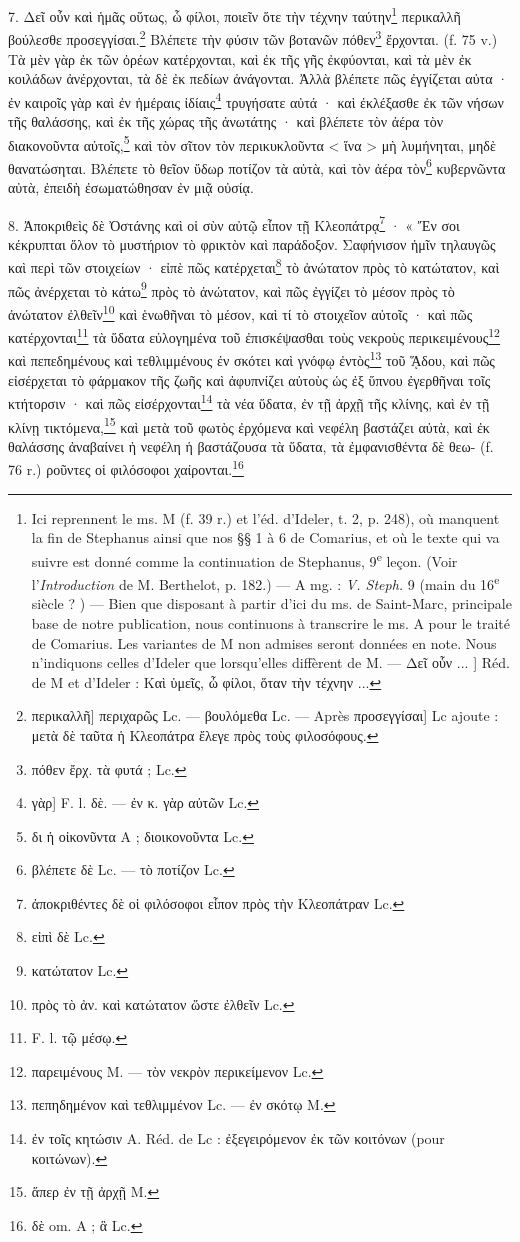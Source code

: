 \documentclass[a4paper, 11pt, oneside, polutonikogreek, french]{article}
\begin{document}
7. Δεῖ οὖν καὶ ἡμᾶς οὕτως, ὧ φίλοι, ποιεῖν ὅτε τὴν τέχνην ταύτην\footnote{Ici reprennent le ms. M (f. 39 r.) et l'éd. d'Ideler, t. 2, p. 248), où manquent la fin de Stephanus ainsi que nos §§ 1 à 6 de Comarius, et où le texte qui va suivre est donné comme la continuation de Stephanus, 9\textsuperscript{e} leçon. (Voir l'\emph{Introduction} de M. Berthelot, p. 182.) --- A mg. : \emph{V. Steph.} 9 (main du 16\textsuperscript{e} siècle ? ) --- Bien que disposant à partir d'ici du ms. de Saint-Marc, principale base de notre publication, nous continuons à transcrire le ms. A pour le traité de Comarius. Les variantes de M non admises seront données en note. Nous n'indiquons celles d'Ideler que lorsqu'elles diffèrent de M. --- Δεῖ οὗν ... ] Réd. de M et d'Ideler : Καὶ ὑμεῖς, ὦ φίλοι, ὅταν τὴν τέχνην ...} περικαλλῆ βούλεσθε προσεγγίσαι.\footnote{περικαλλῆ] περιχαρῶς Lc. --- βουλόμεθα Lc. --- Après προσεγγίσαι] Lc ajoute : μετὰ δὲ ταῦτα ἡ Κλεοπάτρα ἔλεγε πρὸς τοὺς φιλοσόφους.} Βλέπετε τὴν φύσιν τῶν βοτανῶν πόθεν\footnote{πόθεν ἔρχ. τὰ φυτά ; Lc.} ἔρχονται. (f. 75 v.) Τὰ μὲν γὰρ ἐκ τῶν ὀρέων κατέρχονται, καὶ ἐκ τῆς γῆς ἐκφύονται, καὶ τὰ μὲν ἐκ κοιλάδων ἀνέρχονται, τὰ δὲ ἐκ πεδίων ἀνάγονται. Ἀλλὰ βλέπετε πῶς ἐγγίζεται αὐτα · ἐν καιροῖς γὰρ καὶ ἐν ἡμέραις ἰδίαις\footnote{γὰρ] F. l. δὲ. --- ἐν κ. γὰρ αὐτῶν Lc.} τρυγήσατε αὐτά · καὶ ἐκλέξασθε ἐκ τῶν νήσων τῆς θαλάσσης, καὶ ἐκ τῆς χώρας τῆς ἀνωτάτης · καὶ βλέπετε τὸν ἀέρα τὸν διακονοῦντα αὐτοῖς,\footnote{δι ἡ οἰκονῦντα A ; διοικονοῦντα Lc.} καὶ τὸν σῖτον τὸν περικυκλοῦντα < ἵνα > μὴ λυμήνηται, μηδὲ θανατώσηται. Βλέπετε τὸ θεῖον ὕδωρ ποτίζον τὰ αὐτὰ, καὶ τὸν ἀέρα τὸν\footnote{βλέπετε δὲ Lc. --- τὸ ποτίζον Lc.} κυβερνῶντα αὐτὰ, ἐπειδὴ ἐσωματώθησαν ἐν μιᾷ οὐσίᾳ.

8. Ἀποκριθεὶς δὲ Ὀστάνης καὶ οἱ σὺν αὐτῷ εἶπον τῇ Κλεοπάτρᾳ\footnote{ἀποκριθέντες δὲ οἱ φιλόσοφοι εἶπον πρὸς τὴν Κλεοπάτραν Lc.} · « Ἔν σοι κέκρυπται ὅλον τὸ μυστήριον τὸ φρικτὸν καὶ παράδοξον. Σαφήνισον ἡμῖν τηλαυγῶς καὶ περὶ τῶν στοιχείων · εἰπὲ πῶς κατέρχεται\footnote{εἰπὶ δὲ Lc.} τὸ ἀνώτατον πρὸς τὸ κατώτατον, καὶ πῶς ἀνέρχεται τὸ κάτω\footnote{κατώτατον Lc.}     πρὸς τὸ ἀνώτατον, καὶ πῶς ἐγγίζει τὸ μέσον πρὸς τὸ ἀνώτατον ἐλθεῖν\footnote{πρὸς τὸ ἀν. καὶ κατώτατον ὥστε ἐλθεῖν Lc.} καὶ ἑνωθῆναι τὸ μέσον, καὶ τί τὸ στοιχεῖον αὐτοῖς · καὶ πῶς κατέρχονται\footnote{F. l. τῷ μέσῳ.} τὰ ὕδατα εὐλογημένα τοῦ ἐπισκέψασθαι τοὺς νεκροὺς περικειμένους\footnote{παρειμένους M. --- τὸν νεκρὸν περικείμενον Lc.} καὶ πεπεδημένους καὶ τεθλιμμένους ἐν σκότει καὶ γνόφῳ ἐντὸς\footnote{πεπηδημένον καὶ τεθλιμμένον Lc. --- ἐν σκότῳ M.} τοῦ ᾍδου, καὶ πῶς εἰσέρχεται τὸ φάρμακον τῆς ζωῆς καὶ ἀφυπνίζει αὐτοὺς ὡς ἐξ ὕπνου ἐγερθῆναι τοῖς κτήτορσιν · καὶ πῶς εἰσέρχονται\footnote{ἐν τοῖς κητώσιν A. Réd. de Lc : ἐξεγειρόμενον ἐκ τῶν κοιτόνων (pour κοιτώνων).} τὰ νέα ὕδατα, ἐν τῇ ἀρχῇ τῆς κλίνης, καὶ ἐν τῇ κλίνῃ τικτόμενα,\footnote{ἅπερ ἐν τῇ ἀρχῇ M.} καὶ μετὰ τοῦ φωτὸς ἐρχόμενα καὶ νεφέλη βαστάζει αὐτὰ, καὶ ἐκ θαλάσσης ἀναβαίνει ἡ νεφέλη ἡ βαστάζουσα τὰ ὕδατα, τὰ ἐμφανισθέντα δὲ θεω- (f. 76 r.) ροῦντες οἱ φιλόσοφοι χαίρονται.\footnote{δὲ om. A ; ἃ Lc.}
\end{document}
